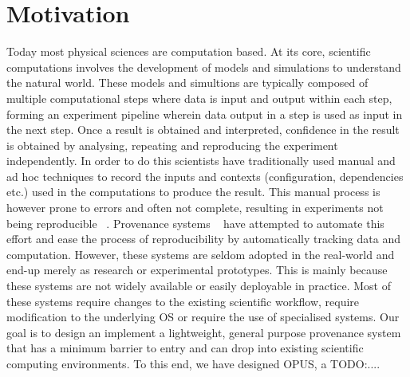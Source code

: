 \documentclass[withindex,glossary]{cam-thesis}
\begin{document}
\section{Motivation}
Today most physical sciences are computation based.
At its core, scientific computations involves the development of models and simulations to understand the natural world. 
These models and simultions are typically composed of multiple computational steps where data is input and output within each step, forming an experiment pipeline wherein data output in a step is used as input in the next step.
Once a result is obtained and interpreted, confidence in the result is obtained by analysing, repeating and reproducing the experiment independently.
In order to do this scientists have traditionally used manual and ad hoc techniques to record the inputs and contexts (configuration, dependencies etc.) used in the computations to produce the result.
This manual process is however prone to errors and often not complete, resulting in experiments not being reproducible ~\cite{non-rep, nature}. 
Provenance systems ~\cite{PASS, BURRITO, StoyBook} have attempted to automate this effort and ease the process of reproducibility by automatically tracking data and computation.
However, these systems are seldom adopted in the real-world and end-up merely as research or experimental prototypes.
This is mainly because these systems are not widely available or easily deployable in practice.
Most of these systems require changes to the existing scientific workflow, require modification to the underlying OS or require the use of specialised systems.
Our goal is to design an implement a lightweight, general purpose provenance system that has a minimum barrier to entry and can drop into existing scientific computing environments.
To this end, we have designed OPUS, a TODO:....





\end{document}
